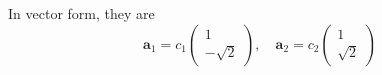 \documentclass{article}
\begin{document}
    In vector form, they are
    \begin{equation*}
        \mathbf{a}_1 = c_1
        \begin{pmatrix*}
            1 \\
            - \sqrt{2}
        \end{pmatrix*}
        , \quad \mathbf{a}_2 = c_2
        \begin{pmatrix*}
            1 \\
            \sqrt 2
        \end{pmatrix*}
    \end{equation*}
\end{document}
